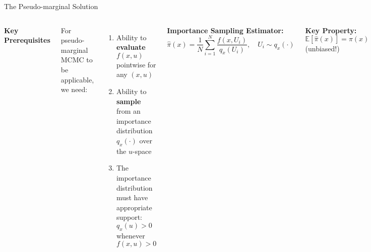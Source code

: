 \documentclass[aspectratio=169]{beamer}
\begin{document}
\begin{frame}{The Pseudo-marginal Solution}

	\begin{columns}

		\textbf{Key Prerequisites}

		\vspace{0.2cm}
		For pseudo-marginal MCMC to be applicable, we need:
		\begin{enumerate}
			\item Ability to \textbf{evaluate} $f(x,u)$ pointwise for any $(x,u)$
			\item Ability to \textbf{sample} from an importance distribution $q_x(\cdot)$ over the $u$-space
			\item The importance distribution must have appropriate support: $q_x(u) > 0$ whenever $f(x,u) > 0$
		\end{enumerate}

		\textbf{Importance Sampling Estimator:}
		\begin{equation*}
			\hat{\pi}(x) = \frac{1}{N} \sum_{i=1}^{N} \frac{f(x,U_i)}{q_x(U_i)}, \quad U_i \sim q_x(\cdot)
		\end{equation*}

		\vspace{0.3cm}
		\textbf{Key Property:} $\mathbb{E}[\hat{\pi}(x)] = \pi(x)$ (unbiased!)

		\vspace{0.3cm}
		\textbf{The Magic:} Replace $\pi$ with $\hat{\pi}$ in MH ratio!
		\begin{equation*}
			\alpha = \min\left\{1, \frac{\hat{\pi}(y)q(y,x)}{\hat{\pi}(x)q(x,y)}\right\}
		\end{equation*}
		\vspace{0.3cm}
		\textcolor{copenhagenred}{\textbf{Result:}} Still targets correct $\pi(x)$!

	\end{columns}
\end{frame}
\end{document}
